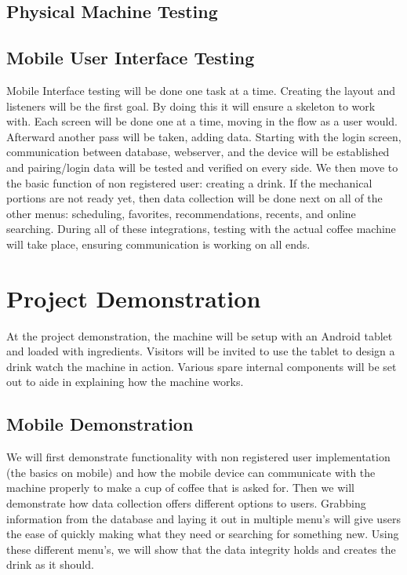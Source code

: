 \documentclass[conference]{IEEEtran}
\begin{document}
\subsection{Physical Machine Testing}

\subsection{Mobile User Interface Testing}
Mobile Interface testing will be done one task at a time. Creating the layout and listeners will be the first
 goal. By doing this it will ensure a skeleton to work with. Each screen will be done one at a time,
moving in the flow as a user would. Afterward another pass will be taken, adding data. Starting with the
 login screen, communication between database, webserver, and the device will be established and
  pairing/login data will be tested and verified on every side. We then move to the basic function of non
  registered user: creating a drink. If the mechanical portions are not ready yet, then data collection will
   be done next on all of the other menus: scheduling, favorites, recommendations, recents, and online
    searching. During all of these integrations, testing with the actual coffee machine will take place, 
    ensuring communication is working on all ends. 

\section{Project Demonstration}
At the project demonstration, the machine will be setup with an Android tablet and loaded with ingredients.
Visitors will be invited to use the tablet to design a drink watch the machine
in action. Various spare internal components will be set out to aide in explaining how the machine works.

\subsection{Mobile Demonstration}
We will first demonstrate functionality with non registered user implementation (the basics on mobile)
 and how the mobile device can communicate with the machine properly to make a cup of coffee that is
  asked for. Then we will demonstrate how data collection offers different options to users. Grabbing 
  information from the database and laying it out in multiple menu's will give users the ease of quickly 
  making what they need or searching for something new. Using these different menu's, we will show 
  that the data integrity holds and creates the drink as it should. 
\end{document}
